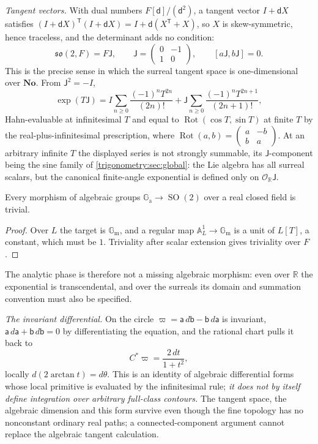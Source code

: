 \documentclass[11pt,letterpaper]{article}
\numberwithin{equation}{section}
\theoremstyle{definition}
\theoremstyle{remark}
\newcommand{\No}{\mathbf{No}}
\newcommand{\R}{\mathbb R}
\newcommand{\OO}{\mathcal O}
\newcommand{\SO}{\operatorname{SO}}
\newcommand{\Rot}{\operatorname{Rot}}
\newcommand{\Gm}{\mathbb G_{\mathrm m}}
\newcommand{\Ga}{\mathbb G_{\mathrm a}}
\begin{document}
\emph{Tangent vectors.} With dual numbers $F[\mathsf d]/(\mathsf d^2)$, a tangent vector $I+\mathsf dX$
satisfies $(I+\mathsf dX)^{\mathsf T}(I+\mathsf dX)=I+\mathsf d(X^{\mathsf T}+X)$, so $X$ is
skew-symmetric, hence traceless, and the determinant adds no condition:
\begin{equation}\label{trigonometry:rot:eq:lie}
 \mathfrak{so}(2,F)=F\mathsf J,\qquad
 \mathsf J=\begin{pmatrix}0&-1\\1&0\end{pmatrix},\qquad [a\mathsf J,b\mathsf J]=0 .
\end{equation}
This is the precise sense in which the surreal tangent space is one-dimensional over $\No$. From
$\mathsf J^2=-I$,
\begin{equation}\label{trigonometry:rot:eq:formalexp}
 \exp(T\mathsf J)=I\sum_{n\ge0}\frac{(-1)^nT^{2n}}{(2n)!}+\mathsf J\sum_{n\ge0}\frac{(-1)^nT^{2n+1}}{(2n+1)!},
\end{equation}
Hahn-evaluable at infinitesimal $T$ and equal to $\Rot(\cos T,\sin T)$ at finite $T$ by the
real-plus-infinitesimal prescription, where
$\Rot(a,b)=\left(\begin{smallmatrix}a&-b\\b&a\end{smallmatrix}\right)$. At an arbitrary infinite
$T$ the displayed series is not strongly summable, its $\mathsf J$-component being the sine family
of \cref{trigonometry:sec:global}: the Lie algebra has all
surreal scalars, but the canonical finite-angle exponential is defined only on $\OO_{\R}\mathsf J$.

\begin{proposition}\label{trigonometry:rot:prop:noalgexp}
Every morphism of algebraic groups $\Ga\to\SO(2)$ over a real closed field is trivial.
\end{proposition}
\begin{proof}
Over $L$ the target is $\Gm$, and a regular map $\mathbb A^1_L\to\Gm$ is a unit of $L[T]$, a
constant, which must be $1$. Triviality after scalar extension gives triviality over $F$.
\end{proof}
The analytic phase is therefore not a missing algebraic morphism: even over $\R$ the exponential is
transcendental, and over the surreals its domain and summation convention must also be specified.

\emph{The invariant differential.} On the circle $\varpi=\mathsf a\,d\mathsf b-\mathsf b\,d\mathsf a$
is invariant, $\mathsf a\,d\mathsf a+\mathsf b\,d\mathsf b=0$ by differentiating the equation, and
the rational chart pulls it back to
\begin{equation}\label{trigonometry:rot:eq:cayleyform}
 C^*\varpi=\frac{2\,dt}{1+t^2},
\end{equation}
locally $d(2\arctan t)=d\theta$. This is an identity of algebraic differential forms whose local
primitive is evaluated by the infinitesimal rule; \emph{it does not by itself define integration over
arbitrary full-class contours.} The tangent space, the algebraic dimension and this form survive
even though the fine topology has no nonconstant ordinary real paths; a connected-component argument
cannot replace the algebraic tangent calculation.
\end{document}
